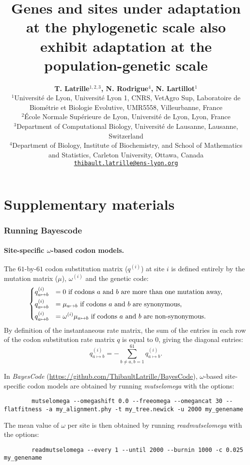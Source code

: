 \documentclass{article}
\title{Genes and sites under adaptation at the phylogenetic scale also exhibit adaptation at the population-genetic scale}
\author{
    \large
    \textbf{T. {Latrille}$^{1,2,3}$, N. {Rodrigue}$^{4}$, N. {Lartillot}$^{1}$}\\
    \scriptsize $^{1}$Université de Lyon, Université Lyon 1, CNRS, VetAgro Sup, Laboratoire de Biométrie et Biologie Evolutive, UMR5558, Villeurbanne, France\\
    \scriptsize $^{2}$École Normale Supérieure de Lyon, Université de Lyon, Lyon, France\\
    \scriptsize $^{3}$Department of Computational Biology, Université de Lausanne, Lausanne, Switzerland\\
    \scriptsize $^{4}$Department of Biology, Institute of Biochemistry, and School of Mathematics and Statistics, Carleton University, Ottawa, Canada \\
    \footnotesize \texttt{\href{mailto:thibault.latrille@ens-lyon.org}{thibault.latrille@ens-lyon.org}} \\
}
\date{}
\renewcommand*{\bm}[1]{#1}%
\newcommand{\UniDimArray}[1]{\bm{#1}}
\begin{document}
    \maketitle
    \part*{Supplementary materials}
    \tableofcontents
    \pagebreak


    \section{Running Bayescode}

    \subsection{Site-specific $\omega$-based codon models.}
    The $61$-by-$61$ codon substitution matrix ($\UniDimArray{q^{(i)}}$) at site $i$ is defined entirely by the mutation matrix ($\UniDimArray{\mu}$), $\omega^{(i)}$ and the genetic code:
    \begin{equation}
        \begin{dcases}
            q_{a \mapsto b}^{(i)} & = 0 \text{ if codons $a$ and $b$ are more than one mutation away,} \\
            q_{a \mapsto b}^{(i)} & = \mu_{a \mapsto b} \text{ if codons $a$ and $b$ are synonymous,} \\
            q_{a \mapsto b}^{(i)} & = \omega^{(i)} \mu_{a \mapsto b} \text{ if codons $a$ and $b$ are non-synonymous}.
        \end{dcases}
    \end{equation}
    By definition of the instantaneous rate matrix, the sum of the entries in each row of the codon substitution rate matrix $\UniDimArray{q}$ is equal to $0$, giving the diagonal entries:
    \begin{equation}
        q_{a \mapsto b}^{(i)}= - \sum\limits_{b \neq a, b = 1}^{61} q_{a \mapsto b}^{(i)}.
    \end{equation}

    In \textit{BayesCode} (\url{https://github.com/ThibaultLatrille/BayesCode}), $\omega$-based site-specific codon models are obtained by running \textit{mutselomega} with the options:
    \begin{scriptsize}
        \begin{verbatim}
        mutselomega --omegashift 0.0 --freeomega --omegancat 30 --flatfitness -a my_alignment.phy -t my_tree.newick -u 2000 my_genename
        \end{verbatim}
    \end{scriptsize}
    The mean value of $\omega$ per site is then obtained by running \textit{readmutselomega} with the options:
    \begin{scriptsize}
        \begin{verbatim}
        readmutselomega --every 1 --until 2000 --burnin 1000 -c 0.025 my_genename
        \end{verbatim}
    \end{scriptsize}
\end{document}
